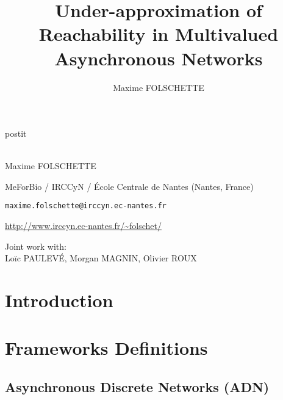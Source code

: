 \documentclass[fleqn,8pt,t]{beamer}
\date{\thedate}
\title[Under-approximation of Reachability in Multivalued Asynchronous Networks]{Under-approximation of Reachability in Multivalued Asynchronous Networks}
\author{Maxime FOLSCHETTE}
\newcommand{\ex}[1]{\textcolor{couleurex}{#1}}
\newcommand{\tcite}[1]{\textcolor{couleurcit}{[#1]}}
\newcommand{\tval}[1]{\textbf{#1}}
\begin{document}
\begin{frame}[plain,label=title]

\begin{center}
\vspace{1cm}
\begin{beamercolorbox}[sep=0.5em]{postit}
\centering
\Large
\textbf{%
{\normalsize\theconference{}}\\~\\%
\inserttitle
}
\end{beamercolorbox}

\par
\medskip
\bigskip
\normalsize
Maxime FOLSCHETTE

\medskip
\footnotesize
MeForBio / IRCCyN / École Centrale de Nantes (Nantes, France)

\texttt{maxime.folschette@irccyn.ec-nantes.fr}

\url{http://www.irccyn.ec-nantes.fr/~folschet/}

\bigskip
Joint work with:
\\
\normalsize
Loïc PAULEVÉ, Morgan MAGNIN, Olivier ROUX
\end{center}

\end{frame}




\newcommand{\cmodels}{\bigskip
\quad\tval{\ex{egfr20}}: \tcite{Epidermal Growth Factor Receptor, by Özgür Sahin \textit{et al.}}\\
\quad\tval{\ex{egfr104}}: \tcite{Epidermal Growth Factor Receptor, by Regina Samaga \textit{et al.}}\\
\quad\tval{\ex{tcrsig40}}: \tcite{T-Cell Receptor Signaling, by Steffen Klamt \textit{et al.}}\\
\quad\tval{\ex{tcrsig94}}: \tcite{T-Cell Receptor Signaling, by Julio Saez-Rodriguez \textit{et al.}}\\}



\section{Introduction}


\section{Frameworks Definitions}
\subsection{Asynchronous Discrete Networks (ADN)}
%
\end{document}
